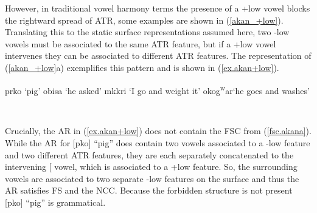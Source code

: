\documentclass[,doc,floatsintext]{apa6}
\theoremstyle{definition}
\theoremstyle{definition}
\theoremstyle{definition}
\theoremstyle{remark}
\begin{document}
However, in traditional vowel harmony terms the presence of a +low vowel
blocks the rightward spread of ATR, some examples are shown in
(\ref{akan_+low}). Translating this to the static surface
representations assumed here, two -low vowels must be associated to the
same ATR feature, but if a +low vowel intervenes they can be associated
to different ATR features. The representation of (\ref{akan_+low}a)
exemplifies this pattern and is shown in (\ref{ex.akan+low}).

\begin{exe}
  \label{akan_+low}
  \begin{xlist}
    \ex prko  `pig'
    \ex obisa `he asked'
    \ex mkkri  `I go and weight it'
    \ex okog\textsuperscript{w}ar\textraiseglotstop `he goes and washes'
  \end{xlist}
\end{exe}

\begin{exe}
\label{ex.akan+low} \\
\end{exe}

\noindent Crucially, the AR in (\ref{ex.akan+low}) does not contain the
FSC from (\ref{fsc.akana}). While the AR for {[}pko{]}
\enquote{pig} does contain two vowels associated to a -low feature and
two different ATR features, they are each separately concatenated to the
intervening {[}\textipa{3}{]} vowel, which is associated to a +low
feature. So, the surrounding vowels are associated to two separate -low
features on the surface and thus the AR satisfies FS and the NCC.
Because the forbidden structure is not present {[}pko{]}
\enquote{pig} is grammatical.
\end{document}
